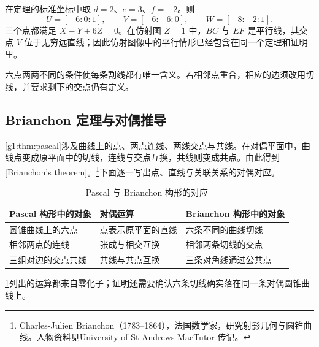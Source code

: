 \begin{example}\label{g1:exm:pascal-infinity}
	在定理的标准坐标中取 \(d=2\)、\(e=3\)、\(f=-2\)。则
	\[
		U=[-6:0:1],\qquad V=[-6:-6:0],\qquad W=[-8:-2:1].
	\]
	三个点都满足 \(X-Y+6Z=0\)。在仿射图 \(Z=1\) 中，\(BC\) 与 \(EF\) 是平行线，其交点 \(V\) 位于无穷远直线；因此仿射图像中的平行情形已经包含在同一个定理和证明里。
\end{example}

六点两两不同的条件使每条割线都有唯一含义。若相邻点重合，相应的边须改用切线，并要求剩下的交点仍有定义。

\subsection{Brianchon 定理与对偶推导}
\label{g1:subsec:0205:04}

\cref{g1:thm:pascal}涉及曲线上的点、两点连线、两线交点与共线。在对偶平面中，曲线点变成原平面中的切线，连线与交点互换，共线则变成共点。由此得到[Brianchon's theorem]。\footnote{Charles-Julien Brianchon（1783--1864），法国数学家，研究射影几何与圆锥曲线。人物资料见University of St Andrews \href{https://mathshistory.st-andrews.ac.uk/Biographies/Brianchon/}{MacTutor 传记}。}下面逐一写出点、直线与关联关系的对偶对应。

\begin{table}[htbp]
	\centering
	\caption{Pascal 与 Brianchon 构形的对应}
	\label{g1:tab:pascal-brianchon}
	\begin{tabularx}{\textwidth}{@{}XXX@{}}
		\toprule
		Pascal 构形中的对象 & 对偶运算 & Brianchon 构形中的对象 \\
		\midrule
		圆锥曲线上的六点 & 点表示原平面的直线 & 六条不同的曲线切线 \\
		相邻两点的连线 & 张成与相交互换 & 相邻两条切线的交点 \\
		三组对边的交点共线 & 共线与共点互换 & 三条对角线通过公共点 \\
		\bottomrule
	\end{tabularx}
\end{table}

\cref{g1:tab:pascal-brianchon}列出的运算都来自零化子；证明还需要确认六条切线确实落在同一条对偶圆锥曲线上。

